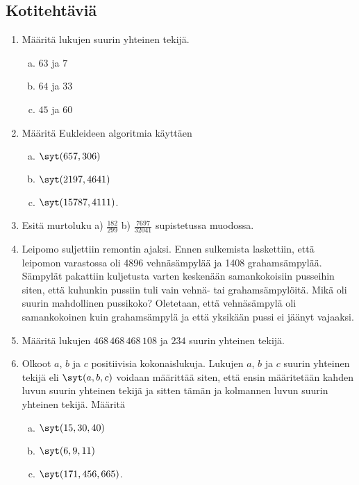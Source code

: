 
\subsection*{Kotitehtäviä}


\begin{enumerate}

\item Määritä lukujen suurin yhteinen tekijä.
\begin{enumerate}[a)]
\item $63$ ja $7$
\item $64$ ja $33$
\item $45$ ja $60$
\end{enumerate}

\item Määritä Eukleideen algoritmia käyttäen
\begin{enumerate}[a)]
\item $\syt(657, 306)$
\item $\syt(2197, 4641)$
\item $\syt(15787, 4111)$.
\end{enumerate}

\item
Esitä murtoluku  a) $\frac{182}{299}$  b) $\frac{7697}{32041}$  supistetussa muodossa.

\item Leipomo suljettiin remontin ajaksi. Ennen sulkemista laskettiin, että leipomon varastossa oli 4896 vehnäsämpylää ja 1408 grahamsämpylää. Sämpylät pakattiin kuljetusta varten keskenään samankokoisiin pusseihin siten, että kuhunkin pussiin tuli vain vehnä- tai grahamsämpylöitä. Mikä oli suurin mahdollinen pussikoko? Oletetaan, että vehnäsämpylä oli samankokoinen kuin grahamsämpylä ja että yksikään pussi ei jäänyt vajaaksi.

\item Määritä lukujen $468\, 468\, 468\, 108$ ja $234$ suurin yhteinen tekijä.

\item Olkoot $a$, $b$ ja $c$ positiivisia kokonaislukuja. Lukujen $a$, $b$ ja $c$ suurin yhteinen tekijä eli $\syt(a, b, c)$ voidaan määrittää siten, että ensin määritetään kahden luvun suurin yhteinen tekijä ja sitten tämän ja kolmannen luvun suurin yhteinen tekijä. Määritä
\begin{enumerate}[a)]
\item $\syt(15, 30, 40)$
\item $\syt(6, 9, 11)$
\item $\syt(171, 456, 665)$.
\end{enumerate}


\end{enumerate}
